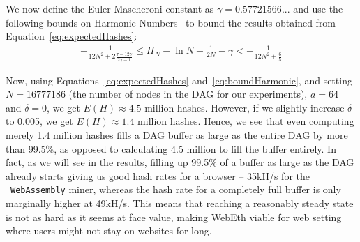 \documentclass[runningheads]{llncs}
\newcommand{\trishita}[1]{}%
\begin{document}
We now define the Euler-Mascheroni constant as $\gamma = 0.57721566...$ and use the following bounds on Harmonic Numbers~\cite{harmonicNumber} to bound the results obtained from Equation~\ref{eq:expectedHashes}:
\begin{gather}
    \label{eq:boundHarmonic}
	-\frac{1}{12N^2+{2\frac{7-12\gamma}{2\gamma-1}}}\le H_N-\ln N-\frac1{2N}-\gamma<-\frac{1}{12N^2+\frac{6}{5}}
\end{gather}  

Now, using Equations~\ref{eq:expectedHashes} and~\ref{eq:boundHarmonic}, and setting $N = 16777186$ (the number of nodes in the DAG for our experiments), $a = 64$ and $\delta = 0$, we get $E(H) \approx 4.5$ million hashes. However, if we slightly increase $\delta$ to 0.005, we get $E(H) \approx 1.4$ million hashes. Hence, we see that even computing merely 1.4 million hashes fills a DAG buffer as large as the entire DAG by more than 99.5\%, as opposed to calculating 4.5 million to fill the buffer entirely. 
In fact, as we will see in the results, filling up 99.5\% of a buffer as large as the DAG already starts giving us good hash rates for a browser -- 35kH/s for the ~\verb|WebAssembly| miner, whereas the hash rate for a completely full buffer is only marginally higher at 49kH/s. 
This means that reaching a reasonably steady state is not as hard as it seems at face value, making WebEth viable for web setting where users might not stay on websites for long. 



\end{document}
